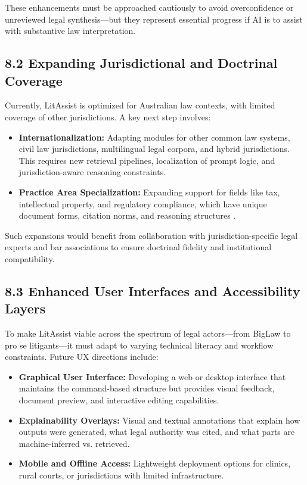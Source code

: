 \documentclass[12pt,a4paper]{article}
\begin{document}
These enhancements must be approached cautiously to avoid overconfidence or unreviewed legal synthesis—but they represent essential progress if AI is to assist with substantive law interpretation.

\subsection*{8.2 Expanding Jurisdictional and Doctrinal Coverage}

Currently, LitAssist is optimized for Australian law contexts, with limited coverage of other jurisdictions. A key next step involves:

\begin{itemize}
\item \textbf{Internationalization:} Adapting modules for other common law systems, civil law jurisdictions, multilingual legal corpora, and hybrid jurisdictions. This requires new retrieval pipelines, localization of prompt logic, and jurisdiction-aware reasoning constraints.

\item \textbf{Practice Area Specialization:} Expanding support for fields like tax, intellectual property, and regulatory compliance, which have unique document forms, citation norms, and reasoning structures \cite{Surden2014}.
\end{itemize}

Such expansions would benefit from collaboration with jurisdiction-specific legal experts and bar associations to ensure doctrinal fidelity and institutional compatibility.

\subsection*{8.3 Enhanced User Interfaces and Accessibility Layers}

To make LitAssist viable across the spectrum of legal actors—from BigLaw to pro se litigants—it must adapt to varying technical literacy and workflow constraints. Future UX directions include:

\begin{itemize}
\item \textbf{Graphical User Interface:} Developing a web or desktop interface that maintains the command-based structure but provides visual feedback, document preview, and interactive editing capabilities.

\item \textbf{Explainability Overlays:} Visual and textual annotations that explain how outputs were generated, what legal authority was cited, and what parts are machine-inferred vs. retrieved.

\item \textbf{Mobile and Offline Access:} Lightweight deployment options for clinics, rural courts, or jurisdictions with limited infrastructure.
\end{itemize}
\end{document}
